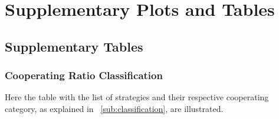 \chapter{Supplementary Plots and Tables}

\section{Supplementary Tables}
\subsection{Cooperating Ratio Classification}
\label{append:class-categories}
Here the table with the list of strategies and their respective cooperating
category, as explained in ~\autoref{sub:classification}, are illustrated.

		\small
